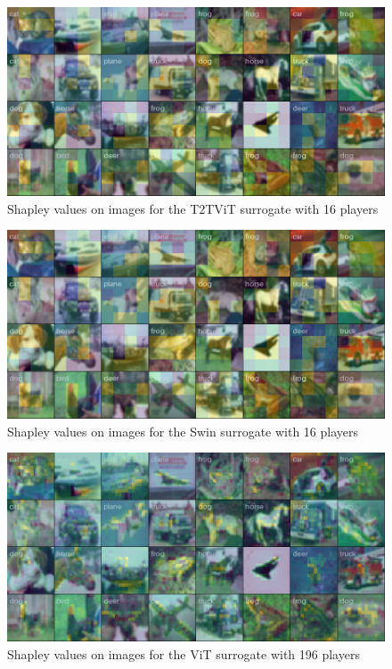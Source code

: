 \documentclass[magisterska,en]{pracamgr}
\begin{document}
\begin{figure}[H]
\centering
\includegraphics[scale=0.4]{./images/t2t_vit_shap_grid.png}
\caption{Shapley values on images for the T2T\textunderscore{}ViT surrogate with 16 players}
\label{t2t_vit_shap_grid}
\end{figure}


\begin{figure}[H]
\centering
\includegraphics[scale=0.4]{./images/swin_shap_grid.png}
\caption{Shapley values on images for the Swin surrogate with 16 players}
\label{swin_shap_grid}
\end{figure}

\pagebreak




\begin{figure}[H]
\centering
\includegraphics[scale=0.4]{./images/vit_shap_grid_196.png}
\caption{Shapley values on images for the ViT surrogate with 196 players}
\label{vit_shap_grid_196}
\end{figure}
\end{document}
